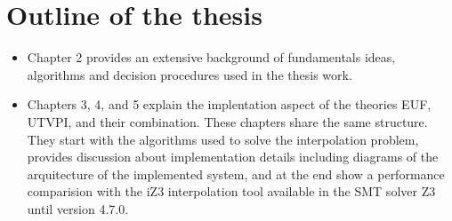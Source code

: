 \section{Outline of the thesis}

\begin{itemize}
\item Chapter 2 provides an extensive background 
  of fundamentals ideas, algorithms and decision procedures 
  used in the thesis work.
\item Chapters 3, 4, and 5 explain the implentation aspect
  of the theories EUF, UTVPI, and their combination. These
  chapters share the same structure. They start with the
  algorithms used to solve the interpolation problem, provides
  discussion about implementation details including diagrams
  of the arquitecture of the implemented system, and at the end
  show a performance comparision with the iZ3 interpolation 
  tool available in the SMT solver Z3 until version 4.7.0.
\end{itemize} 

